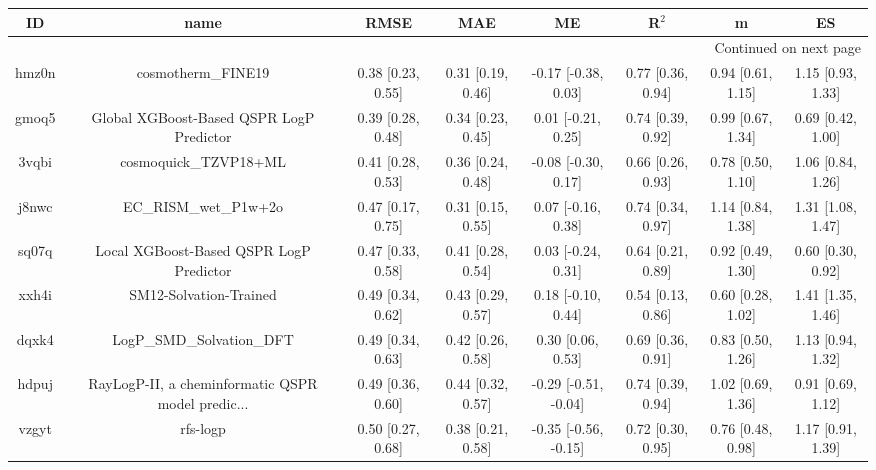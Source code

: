 \documentclass{article}
\begin{document}
\begin{center}
\begin{longtable}{|cccccccc|}
\toprule
    ID &                                               name &               RMSE &                MAE &                    ME &              R$^2$ &                    m &                    ES \\
\midrule
\endhead
\midrule
\multicolumn{8}{r}{{Continued on next page}} \\
\midrule
\endfoot

\bottomrule
\endlastfoot
 hmz0n &                                 cosmotherm\_FINE19 &  0.38 [0.23, 0.55] &  0.31 [0.19, 0.46] &   -0.17 [-0.38, 0.03] &  0.77 [0.36, 0.94] &    0.94 [0.61, 1.15] &     1.15 [0.93, 1.33] \\
 gmoq5 &           Global XGBoost-Based QSPR LogP Predictor &  0.39 [0.28, 0.48] &  0.34 [0.23, 0.45] &    0.01 [-0.21, 0.25] &  0.74 [0.39, 0.92] &    0.99 [0.67, 1.34] &     0.69 [0.42, 1.00] \\
 3vqbi &                              cosmoquick\_TZVP18+ML &  0.41 [0.28, 0.53] &  0.36 [0.24, 0.48] &   -0.08 [-0.30, 0.17] &  0.66 [0.26, 0.93] &    0.78 [0.50, 1.10] &     1.06 [0.84, 1.26] \\
 j8nwc &                              EC\_RISM\_wet\_P1w+2o &  0.47 [0.17, 0.75] &  0.31 [0.15, 0.55] &    0.07 [-0.16, 0.38] &  0.74 [0.34, 0.97] &    1.14 [0.84, 1.38] &     1.31 [1.08, 1.47] \\
 sq07q &            Local XGBoost-Based QSPR LogP Predictor &  0.47 [0.33, 0.58] &  0.41 [0.28, 0.54] &    0.03 [-0.24, 0.31] &  0.64 [0.21, 0.89] &    0.92 [0.49, 1.30] &     0.60 [0.30, 0.92] \\
 xxh4i &                             SM12-Solvation-Trained &  0.49 [0.34, 0.62] &  0.43 [0.29, 0.57] &    0.18 [-0.10, 0.44] &  0.54 [0.13, 0.86] &    0.60 [0.28, 1.02] &     1.41 [1.35, 1.46] \\
 dqxk4 &                          LogP\_SMD\_Solvation\_DFT &  0.49 [0.34, 0.63] &  0.42 [0.26, 0.58] &     0.30 [0.06, 0.53] &  0.69 [0.36, 0.91] &    0.83 [0.50, 1.26] &     1.13 [0.94, 1.32] \\
 hdpuj &  RayLogP-II, a cheminformatic QSPR model predic... &  0.49 [0.36, 0.60] &  0.44 [0.32, 0.57] &  -0.29 [-0.51, -0.04] &  0.74 [0.39, 0.94] &    1.02 [0.69, 1.36] &     0.91 [0.69, 1.12] \\
 vzgyt &                                           rfs-logp &  0.50 [0.27, 0.68] &  0.38 [0.21, 0.58] &  -0.35 [-0.56, -0.15] &  0.72 [0.30, 0.95] &    0.76 [0.48, 0.98] &     1.17 [0.91, 1.39] \\

\end{longtable}
\end{center}
\end{document}
